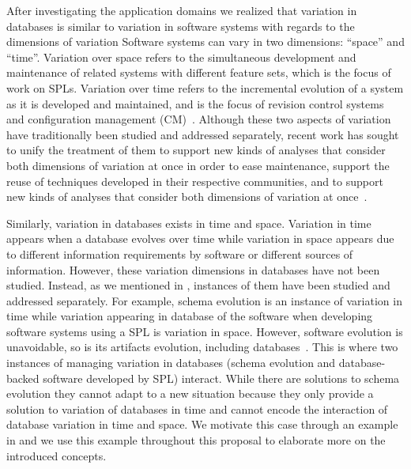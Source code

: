 After investigating the application domains we realized that variation
in databases is similar to variation in software systems with regards
to the dimensions of variation
%
Software systems can vary in two dimensions: ``space'' and ``time''.
Variation over space refers to the simultaneous development and maintenance of
related systems with different feature sets, which is the focus of work on
SPLs.
%
Variation over time refers to the incremental evolution of a system as it is
developed and maintained, and is the focus of revision control systems and
configuration management (CM)~\cite{Dart91}.
%
Although these two aspects of variation have traditionally been studied and
addressed separately, recent work has sought to unify the treatment of them
to support new kinds
of analyses that consider both dimensions of variation at once
in order to ease maintenance, support the reuse of
techniques developed in their respective communities, and to support new kinds
of analyses that consider both dimensions of variation at once~\cite{Thu19vv}.
%



Similarly, variation in databases exists in time and space. 
Variation in time  appears when a database evolves 
over time while variation in space  appears due
to different information requirements by software or different
sources of information. 
%
However, these variation dimensions in databases have not
been studied. Instead, as we mentioned in ,
instances of them have been studied and addressed separately. 
%
For example, schema evolution is an instance of variation in
time while variation appearing in database of the software 
when developing software systems using a SPL is variation in 
space.
%
However, software evolution is unavoidable, so is its artifacts evolution, 
including databases~\cite{dbSPLevolve}.
This is where two instances of managing 
variation in databases (schema evolution and database-backed software 
developed by SPL) interact.
While there are solutions to schema evolution
they cannot adapt to a new situation because they only provide a solution to
variation of databases in time and cannot encode the interaction of database variation in
time and space.
We motivate this case through an example in  and we use this
example throughout this proposal to elaborate more on the introduced 
concepts. 

